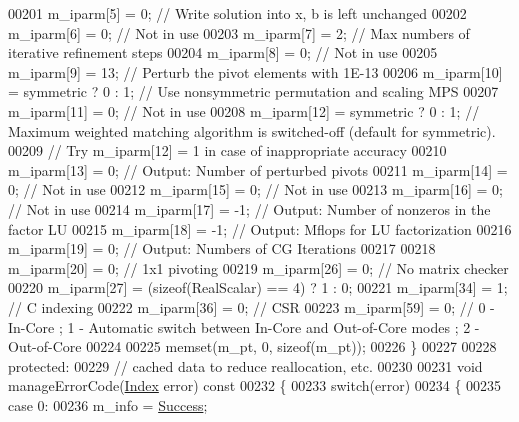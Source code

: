 \begin{DoxyCode}
00201       m\_iparm[5] = 0;   \textcolor{comment}{// Write solution into x, b is left unchanged}
00202       m\_iparm[6] = 0;   \textcolor{comment}{// Not in use}
00203       m\_iparm[7] = 2;   \textcolor{comment}{// Max numbers of iterative refinement steps}
00204       m\_iparm[8] = 0;   \textcolor{comment}{// Not in use}
00205       m\_iparm[9] = 13;  \textcolor{comment}{// Perturb the pivot elements with 1E-13}
00206       m\_iparm[10] = symmetric ? 0 : 1; \textcolor{comment}{// Use nonsymmetric permutation and scaling MPS}
00207       m\_iparm[11] = 0;  \textcolor{comment}{// Not in use}
00208       m\_iparm[12] = symmetric ? 0 : 1;  \textcolor{comment}{// Maximum weighted matching algorithm is switched-off (default for
       symmetric).}
00209                                         \textcolor{comment}{// Try m\_iparm[12] = 1 in case of inappropriate accuracy}
00210       m\_iparm[13] = 0;  \textcolor{comment}{// Output: Number of perturbed pivots}
00211       m\_iparm[14] = 0;  \textcolor{comment}{// Not in use}
00212       m\_iparm[15] = 0;  \textcolor{comment}{// Not in use}
00213       m\_iparm[16] = 0;  \textcolor{comment}{// Not in use}
00214       m\_iparm[17] = -1; \textcolor{comment}{// Output: Number of nonzeros in the factor LU}
00215       m\_iparm[18] = -1; \textcolor{comment}{// Output: Mflops for LU factorization}
00216       m\_iparm[19] = 0;  \textcolor{comment}{// Output: Numbers of CG Iterations}
00217       
00218       m\_iparm[20] = 0;  \textcolor{comment}{// 1x1 pivoting}
00219       m\_iparm[26] = 0;  \textcolor{comment}{// No matrix checker}
00220       m\_iparm[27] = (\textcolor{keyword}{sizeof}(RealScalar) == 4) ? 1 : 0;
00221       m\_iparm[34] = 1;  \textcolor{comment}{// C indexing}
00222       m\_iparm[36] = 0;  \textcolor{comment}{// CSR}
00223       m\_iparm[59] = 0;  \textcolor{comment}{// 0 - In-Core ; 1 - Automatic switch between In-Core and Out-of-Core modes ; 2 -
       Out-of-Core}
00224       
00225       memset(m\_pt, 0, \textcolor{keyword}{sizeof}(m\_pt));
00226     \}
00227 
00228   \textcolor{keyword}{protected}:
00229     \textcolor{comment}{// cached data to reduce reallocation, etc.}
00230     
00231     \textcolor{keywordtype}{void} manageErrorCode(\hyperlink{namespace_eigen_a62e77e0933482dafde8fe197d9a2cfde}{Index} error)\textcolor{keyword}{ const}
00232 \textcolor{keyword}{    }\{
00233       \textcolor{keywordflow}{switch}(error)
00234       \{
00235         \textcolor{keywordflow}{case} 0:
00236           m\_info = \hyperlink{group__enums_gga85fad7b87587764e5cf6b513a9e0ee5ea52581b035f4b59c203b8ff999ef5fcea}{Success};

\end{DoxyCode}

